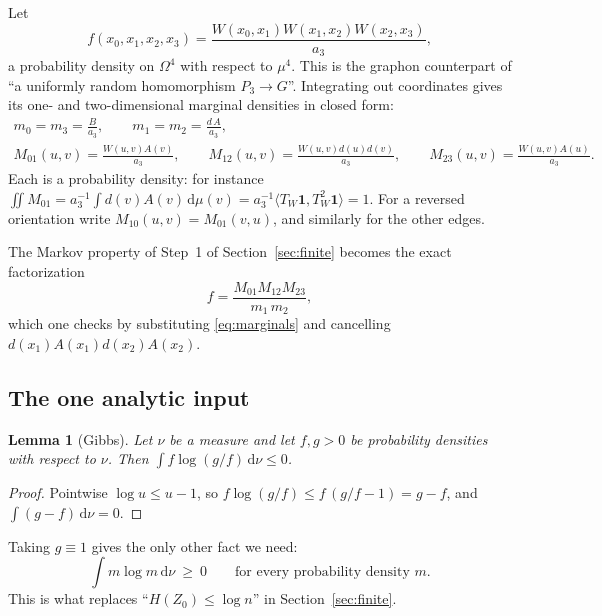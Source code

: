 \documentclass[11pt]{article}
\newtheorem{lemma}[theorem]{Lemma}
\newcommand{\dd}{\,\mathrm d}
\begin{document}
Let
\[
 f(x_0,x_1,x_2,x_3)
 =\frac{W(x_0,x_1)W(x_1,x_2)W(x_2,x_3)}{a_3},
\]
a probability density on $\Omega^4$ with respect to $\mu^4$.  This is the
graphon counterpart of ``a uniformly random homomorphism $P_3\to G$''.
Integrating out coordinates gives its one- and two-dimensional marginal
densities in closed form:
\begin{equation}
\begin{gathered}
 m_0=m_3=\frac{B}{a_3},\qquad m_1=m_2=\frac{d\,A}{a_3},\\[2pt]
 M_{01}(u,v)=\frac{W(u,v)A(v)}{a_3},\qquad
 M_{12}(u,v)=\frac{W(u,v)d(u)d(v)}{a_3},\qquad
 M_{23}(u,v)=\frac{W(u,v)A(u)}{a_3}.
\end{gathered}
\label{eq:marginals}
\end{equation}
Each is a probability density: for instance
$\iint M_{01}=a_3^{-1}\int d(v)A(v)\dd\mu(v)
=a_3^{-1}\langle T_W\mathbf1,T_W^2\mathbf1\rangle=1$.
For a reversed orientation write $M_{10}(u,v)=M_{01}(v,u)$, and similarly for
the other edges.

The Markov property of Step~1 of Section~\ref{sec:finite} becomes the exact
factorization
\begin{equation}
 f=\frac{M_{01}M_{12}M_{23}}{m_1\,m_2},
 \label{eq:tree-factorization}
\end{equation}
which one checks by substituting \eqref{eq:marginals} and cancelling
$d(x_1)A(x_1)d(x_2)A(x_2)$.

\subsection{The one analytic input}

\begin{lemma}[Gibbs]
\label{lem:gibbs}
Let $\nu$ be a measure and let $f,g>0$ be probability densities with respect to
$\nu$.  Then $\int f\log(g/f)\dd\nu\leq0$.
\end{lemma}

\begin{proof}
Pointwise $\log u\leq u-1$, so
$f\log(g/f)\leq f\,(g/f-1)=g-f$, and $\int(g-f)\dd\nu=0$.
\end{proof}

Taking $g\equiv1$ gives the only other fact we need:
\begin{equation}
 \int m\log m\dd\nu\ \geq\ 0
 \qquad\text{for every probability density $m$.}
 \label{eq:rel-entropy-nonneg}
\end{equation}
This is what replaces ``$H(Z_0)\leq\log n$'' in Section~\ref{sec:finite}.
\end{document}
